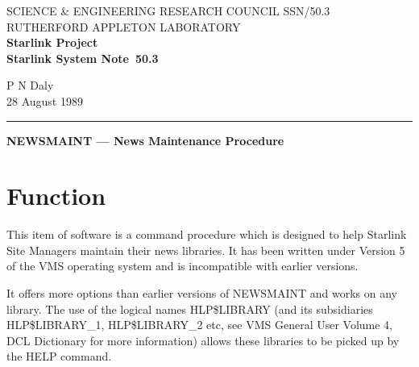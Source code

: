 \pagestyle{myheadings}

\newcommand{\stardoccategory}  {Starlink System Note}
\newcommand{\stardocinitials}  {SSN}
\newcommand{\stardocnumber}    {50.3}
\newcommand{\stardocauthors}   {P N Daly}
\newcommand{\stardocdate}      {28 August 1989}
\newcommand{\stardoctitle}     {NEWSMAINT --- News Maintenance Procedure}

\newcommand{\stardocname}{\stardocinitials /\stardocnumber}
\markright{\stardocname}
\setlength{\textwidth}{160mm}
\setlength{\textheight}{240mm}
\setlength{\topmargin}{-5mm}
\setlength{\oddsidemargin}{0mm}
\setlength{\evensidemargin}{0mm}
\setlength{\parindent}{0mm}
\setlength{\parskip}{\medskipamount}
\setlength{\unitlength}{1mm}


\thispagestyle{empty}
SCIENCE \& ENGINEERING RESEARCH COUNCIL \hfill \stardocname\\
RUTHERFORD APPLETON LABORATORY\\
{\large\bf Starlink Project\\}
{\large\bf \stardoccategory\ \stardocnumber}
\begin{flushright}
\stardocauthors\\
\stardocdate
\end{flushright}
\vspace{-4mm}
\rule{\textwidth}{0.5mm}
\vspace{5mm}
\begin{center}
{\Large\bf \stardoctitle}
\end{center}
\vspace{5mm}

\section{Function}

This item of software is a command procedure which is designed to help Starlink
Site Managers maintain their news libraries. It has been written under 
Version 5 of the VMS operating system and is incompatible with earlier versions.

It offers more options than earlier versions of NEWSMAINT and works on any
library. The use of the logical names HLP\$LIBRARY  (and its subsidiaries
HLP\$LIBRARY\_1, HLP\$LIBRARY\_2 etc, see VMS General User Volume 4, DCL
Dictionary for more information) allows these libraries to be picked up by 
the HELP command.

